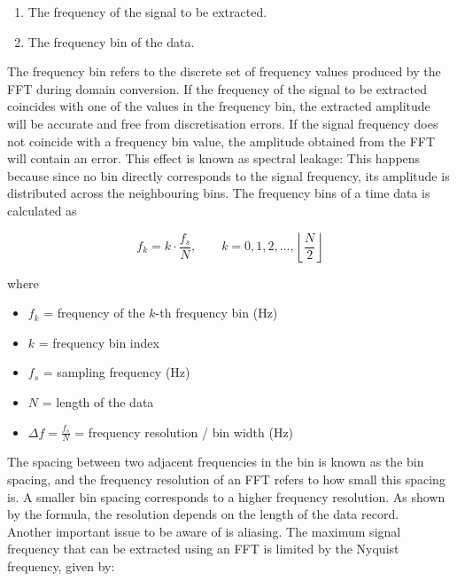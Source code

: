 \documentclass[../main]{subfiles}
\begin{document}
\begin{enumerate}
    \setlength{\itemsep}{0pt}\setlength{\parskip}{0pt}
    \item The frequency of the signal to be extracted.
    \item The frequency bin of the data.
\end{enumerate}

The frequency bin refers to the discrete set of frequency values produced by the FFT during
domain conversion. If the frequency of the signal to be extracted coincides with one of the
values in the frequency bin, the extracted amplitude will be accurate and free from
discretisation errors. If the signal frequency does not coincide with a frequency bin value, the amplitude obtained
from the FFT will contain an error. This effect is known as spectral leakage: This happens because since 
no bin directly corresponds to the signal frequency, its amplitude is distributed across the
neighbouring bins. The frequency bins of a time data is calculated as

\begin{equation}
f_k = k \cdot \frac{f_s}{N}, \qquad k = 0, 1, 2, \dots, \left\lfloor \frac{N}{2} \right\rfloor
\end{equation}

where
\begin{itemize}
    \item $f_k$ \quad = frequency of the $k$-th frequency bin (Hz)
    \item $k$     \quad = frequency bin index 
    \item $f_s$   \quad = sampling frequency (Hz)
    \item $N$     \quad = length of the data
    \item $\Delta f = \frac{f_s}{N}$ \quad = frequency resolution / bin width (Hz)
\end{itemize}

\vspace{0.3cm}

The spacing between two adjacent frequencies in the bin is known as the bin spacing,
and the frequency resolution of an FFT refers to how small this spacing is. A smaller
bin spacing corresponds to a higher frequency resolution. As shown by the formula, the
resolution depends on the length of the data record.\\

Another important issue to be aware of is aliasing. The maximum signal frequency that
can be extracted using an FFT is limited by the Nyquist frequency, given by:
\end{document}
